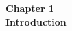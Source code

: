 \setcounter{page}{1}

\begin{center}

    \thispagestyle{empty}
    \vspace*{\fill}
    
    \Huge 
    \textbf{Chapter 1\\ Introduction}
       

    \vspace*{\fill}
\end{center}